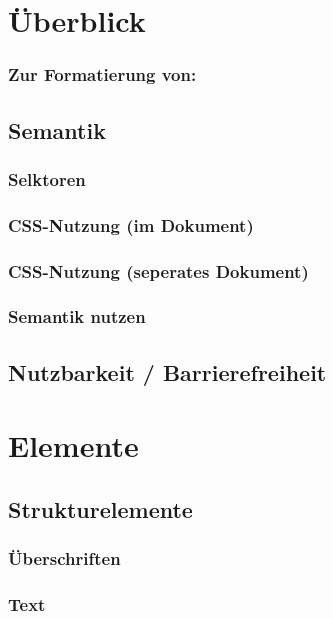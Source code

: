 \section{Überblick}
\subsubsection*{Zur Formatierung von:}
\subsection{Semantik}
\subsubsection{Selktoren}
\subsubsection{CSS-Nutzung (im Dokument)}
\subsubsection{CSS-Nutzung (seperates Dokument)}
\subsubsection{Semantik nutzen}
\subsection{Nutzbarkeit / Barrierefreiheit}

\section{Elemente}

\subsection{Strukturelemente}
\subsubsection{Überschriften}
\subsubsection{Text}
